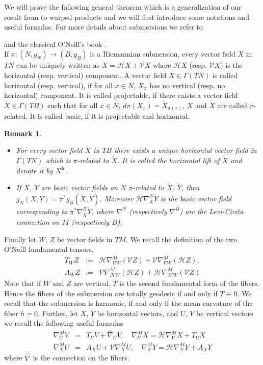 \documentclass[12pt]{article}
\newtheorem{remark}[lemma]{Remark}
\numberwithin{lemma}{section}
\newcommand{\h}{\mathbf{h}}
\begin{document}
We will prove the following general theorem which is a generalization of our result from \cite{LO} to warped products and we will first introduce some notations and useful formulas. For more details about submersions we refer to {\cite{Escobales} and the classical O'Neill's book \cite{ON}. \\

If $\pi:(N,g_N)\rightarrow(B,g_B)$ is a Riemannian submersion, every vector field $X$ in $TN$ can be uniquely
written as $X=\mathcal{H}X+\mathcal{V}X$ where
$\mathcal{H}X$ (resp. $\mathcal{V}X$) is the horizontal (resp.
vertical) component. A vector field $X\in\Gamma(TN)$ is
called horizontal (resp. vertical), if  for all $x\in N$,
$X_{x}$ has no vertical (resp. no horizontal) component. It is called projectable, if there exists a vector field $\check{X}\in\Gamma(TB)$ such
 that for all $x\in N$,
 $d\pi(X_{x})=\check{X}_{\pi(x)}$, $X$ and
 $\check{X}$ are called $\pi$-related. It is called basic, if it is projectable and horizontal.

\begin{remark}\label{remark_submersions} \normalfont 


\begin{itemize}
\item[1)] For every vector field $\check{X}$ in $TB$ there exists a unique horizontal vector field in $\Gamma(TN)$ which is $\pi$-related to $\check{X}$. It is called the horizontal lift of $\check{X}$ and denote it by $X^{\h}$.
\item[2)] If $X$, $Y$ are basic vector fields on $N$ $\pi$-related to $\check{X}$, $\check{Y}$, then
$g_N(X,Y)=\pi^*g_B(\check{X},\check{Y})$. Moreover $\mathcal{H}\nabla^N_XY$ is the basic vector field corresponding to $\pi^*\nabla^B_{\check{X}}\check{Y}$, where $\nabla^N$ (respectively $\nabla^B$) are the Levi-Civita connection on $M$ (respectively $B$).
\end{itemize}
\end{remark}
Finally let $W$, $Z$ be vector fields in $TM$. We recall the definition of the two O'Neill fundamental tensors.
\begin{eqnarray}
T_WZ&:=&\mathcal{H}\nabla^M_{\mathcal{V}W}(\mathcal{V}Z)+\mathcal{V}\nabla^M_{\mathcal{V}W}(\mathcal{H}Z),\nonumber\\
A_WZ&:=&\mathcal{V}\nabla^M_{\mathcal{H}W}(\mathcal{H}Z)+\mathcal{H}\nabla^M_{\mathcal{H}W}(\mathcal{V}Z)
\end{eqnarray}
Note that if $W$ and $Z$ are vertical, $T$ is the second fundamental form of the fibers. Hence  the fibers of the submersion are totally geodesic if and only if $T\equiv 0$. We recall that the submersion is harmonic, if and only if the mean curvature of the fiber $h=0$. Further, let $X$, $Y$ be horizontal vectors, and $U$, $V$ be vertical vectors we recall the following useful formulas
\begin{eqnarray}\label{connection_ONtensors}
\nabla^M_UV&=&T_UV+\hat{\nabla}_UV, \quad \nabla^M_UX=\mathcal{H}\nabla^M_VX+T_UX\\
\nabla^M_XU&=&A_XU+\mathcal{V}\nabla^M_XU,\quad \nabla^M_XY=\mathcal{H}\nabla^M_XY+A_XY
\end{eqnarray}
where $\hat{\nabla}$ is the connection on the fibers.


}
\end{document}
